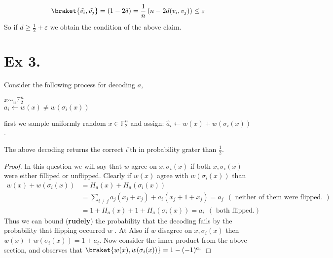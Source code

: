 \documentclass{article}
\newcommand{\FF}{\mathbb{F}}
\begin{document}
\begin{equation*}
  \begin{split}
    \braket{ \tilde{v_{i}},\tilde{v_{j}}} = \left(1 - 2\delta \right)= \frac{1}{n}\left( n -2 d(v_{i},v_{j}) \right) \le  \varepsilon
  \end{split}
\end{equation*}
So if $d \ge \frac{1}{2} + \varepsilon$ we obtain the condition of the above claim. 

\section{Ex 3.}
Consider the following process for decoding $a$,


\begin{algorithm}[H]
   {
    $x \sim_{u} \FF_{2}^{n}$ \\
    $a_{i} \leftarrow w\left( x \right) \neq  w\left( \sigma_{i}(x) \right)$
  }
\end{algorithm}


first we sample uniformly random $x \in \FF_{2}^{n}$ and assign: $\hat{a}_{i} \leftarrow w(x) + w(\sigma_{i}(x))$.
\begin{claim}
  The above decoding returns the correct $i$'th in probability grater than $\frac{1}{2}$. 
\end{claim}
\begin{proof}
  In this question we will say that $w$ agree on $x,\sigma_{i}(x)$ if both $x,\sigma_{i}(x)$ were either filliped or unflipped. Clearly if $w(x)$ agree with $w(\sigma_{i}(x))$ than  
  \begin{equation*}
    \begin{split}
      w\left( x \right) + w\left( \sigma_{i}(x) \right) & = H_{a}(x) + H_{a}(\sigma_{i}(x)) \\
      & = \sum_{i\neq j }{a_{j}(x_{j} + x_{j})} + a_{i}(x_{j} + 1 + x_{j})  = a_{j} \ \ ( \text{   neither of them were flipped. } ) \\
      & = 1 + H_{a}(x) + 1 + H_{a}(\sigma_{i}(x)) =  a_{i} \ \ (  \text{   both flipped.} )
    \end{split}
  \end{equation*}
  Thus we can bound (\textbf{rudely}) the probability that the decoding fails by the probability that flipping occurred  $w$  . At   Also if $w$ disagree on $x,\sigma_{i}\left( x \right)$ then  $w\left( x \right) + w\left( \sigma_{i}(x) \right) = 1 + a_{i} $.
  Now consider the inner product from the above section, and observes that $\braket{w(x),w(\sigma_{i}(x))} = 1 - (-1)^{a_{i}}$      

\end{proof}

  \printbibliography 
\end{document}
